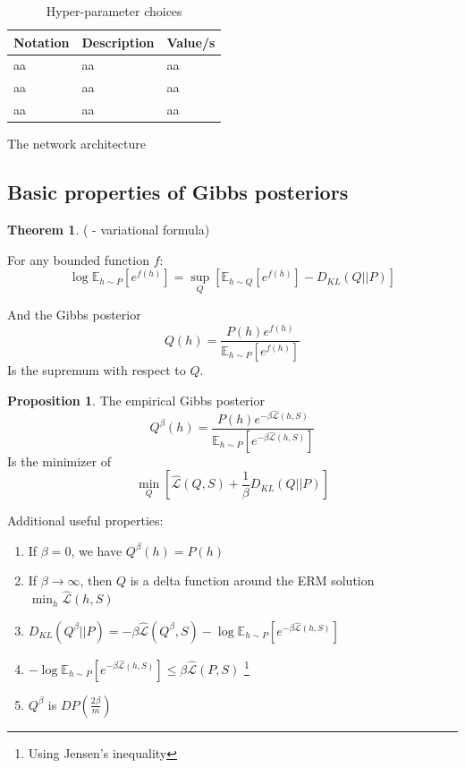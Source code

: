 \documentclass{article}
\theoremstyle{definition}
\newtheorem{theorem}{Theorem}[section]
\newtheorem{proposition}{Proposition}[section]
\newcommand{\Expect}[2]{\mathbb{E}_{#1}\left [#2 \right ]}
\begin{document}
\begin{table}	
	
	\centering
	\begin{tabular}{lll}
		\toprule
		Notation   & Description  & Value/s   \\
		\midrule
		aa & aa   & aa      \\
		\midrule
		aa & aa   & aa      \\
		\midrule
		aa  & aa   & aa      \\

		\bottomrule
	\end{tabular}
	\caption{Hyper-parameter choices}
	\label{table:hyper-params}
\end{table}

The network architecture 

\subsection{Basic properties of Gibbs posteriors} \label{append:gibbs-properties}

\begin{theorem} (\citet{Donsker1975} - variational formula)
	
	For any bounded function $f$:
	\begin{equation*} 
	\log \Expect{h\sim P}{e^{f(h)}}=\sup_{Q}\left[\Expect{h\sim Q}{e^{f(h)}}-D_{KL}(Q||P) \right ]
	\end{equation*}
	
	And the Gibbs posterior 
	$$Q(h)=\frac{P(h)e^{f(h)}}{\Expect{h\sim P}{e^{f(h)}}}$$ 
	Is the supremum with respect to $Q$.
\end{theorem}

\begin{proposition}
	The empirical Gibbs posterior 
	$$Q^\beta(h)=\frac{P(h)e^{-\beta \hat{\mathcal{L}}(h, S)}}{\Expect{h\sim P}{e^{-\beta \hat{\mathcal{L}}(h, S)}}}$$ 
	Is the minimizer of $$\min_{Q}\left[\hat{\mathcal{L}}(Q, S)+\frac{1}{\beta}D_{KL}(Q||P)\right ]$$
\end{proposition}

Additional useful properties:
\begin{enumerate}
	\item If $\beta=0$, we have $Q^\beta(h)=P(h)$
	\item If $\beta\rightarrow \infty$, then $Q$ is a delta function around the ERM solution $\min_h \hat{\mathcal{L}}(h,S)$
	\item $D_{KL}(Q^\beta||P)=-\beta\hat{\mathcal{L}}(Q^\beta, S)-\log\Expect{h\sim P}{e^{-\beta \hat{\mathcal{L}}(h, S)}}$
	\item $-\log\Expect{h\sim P}{e^{-\beta \hat{\mathcal{L}}(h, S)}}\leq \beta\hat{\mathcal{L}}(P,S)$ \footnote{Using Jensen's inequality}
	\item $Q^\beta$ is $DP(\frac{2\beta}{m})$ \citep{McSherry2007}
\end{enumerate}
\end{document}
